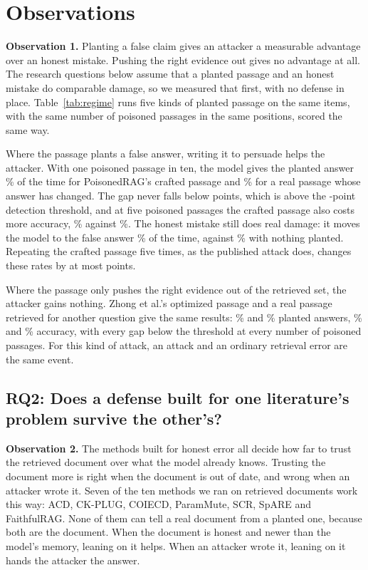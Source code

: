 \section{Observations}
\label{sec:results}
\label{sec:regime}

\textbf{Observation 1.} Planting a false claim gives an attacker a measurable
advantage over an honest mistake. Pushing the right evidence out gives no
advantage at all. The research questions below assume that a planted passage
and an honest mistake do comparable damage, so we measured that first, with no
defense in place. Table~\ref{tab:regime} runs five kinds of planted passage on
the same items, with the same number of poisoned passages in the same
positions, scored the same way.

Where the passage plants a false answer, writing it to persuade helps the
attacker. With one poisoned passage in ten, the model gives the planted answer
\PctCraftLow{}\% of the time for PoisonedRAG's crafted passage and
\PctStaleLow{}\% for a real passage whose answer has changed. The gap never
falls below \NRegimeGapMin{} points, which is above the \NRegimeThresh{}-point
detection threshold, and at five poisoned passages the crafted passage also
costs more accuracy, \AccCraftTop{}\% against \AccStaleTop{}\%. The honest
mistake still does real damage: it moves the model to the false answer
\PctStaleTop{}\% of the time, against \PctStaleClean{}\% with nothing planted.
Repeating the crafted passage five times, as the published attack does,
changes these rates by at most \NRegimeRepeatMax{} points.

Where the passage only pushes the right evidence out of the retrieved set, the
attacker gains nothing. Zhong et al.'s optimized passage and a real passage
retrieved for another question give the same results: \PctCorpusTop{}\% and
\PctMisretrievalTop{}\% planted answers, \AccCorpusTop{}\% and
\AccMisretrievalTop{}\% accuracy, with every gap below the threshold at every
number of poisoned passages. For this kind of attack, an attack and an
ordinary retrieval error are the same event.



\subsection{RQ2: Does a defense built for one literature's problem survive the other's?}

\textbf{Observation 2.} The methods built for honest error all decide how far
to trust the retrieved document over what the model already knows. Trusting
the document more is right when the document is out of date, and wrong when an
attacker wrote it. Seven of the ten methods we ran on retrieved documents
work this way: ACD, CK-PLUG, COIECD, ParamMute, SCR, SpARE and FaithfulRAG.
None of them can tell a real document from a planted one, because both are
the document. When the document is honest and newer than the model's memory,
leaning on it helps. When an attacker wrote it, leaning on it hands the
attacker the answer.

